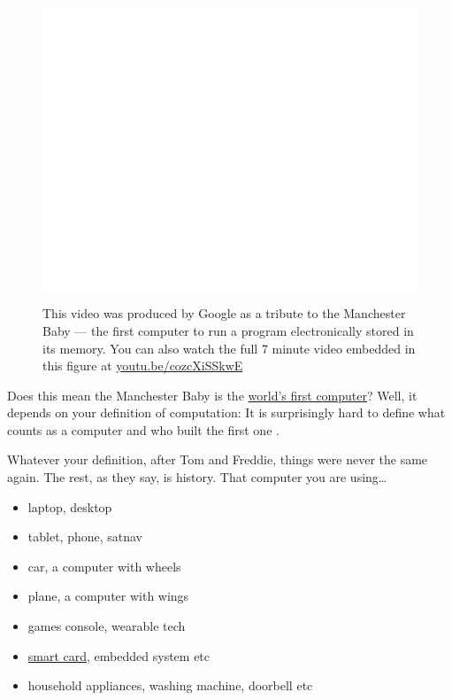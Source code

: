 \documentclass[
  12pt,
]{book}
\providecommand{\tightlist}{%
  \setlength{\itemsep}{0pt}\setlength{\parskip}{0pt}}
\begin{document}
\begin{figure}

{\centering \href{https://www.youtube.com/embed/cozcXiSSkwE}{\includegraphics[width=0.99\linewidth]{duncan-hull_files/figure-latex/baby-fig-1} }

}

\caption{This video was produced by Google as a tribute to the Manchester Baby --- the first computer to run a program electronically stored in its memory. You can also watch the full 7 minute video embedded in this figure at \href{https://youtu.be/cozcXiSSkwE}{youtu.be/cozcXiSSkwE} \citep{youtube-baby}}\label{fig:baby-fig}
\end{figure}



Does this mean the Manchester Baby is the \href{https://www.computerhope.com/issues/ch000984.htm}{world's first computer}? Well, it depends on your definition of computation: It is surprisingly hard to define what counts as a computer and who built the first one \citep{firstcomputer}.

Whatever your definition, after Tom and Freddie, things were never the same again. The rest, as they say, is history. That computer you are using\ldots{}

\begin{itemize}
\tightlist
\item
  laptop, desktop
\item
  tablet, phone, satnav
\item
  car, a computer with wheels
\item
  plane, a computer with wings
\item
  games console, wearable tech
\item
  \href{https://en.wikipedia.org/wiki/Smart_card}{smart card}, embedded system etc
\item
  household appliances, washing machine, doorbell etc
\end{itemize}
\end{document}
